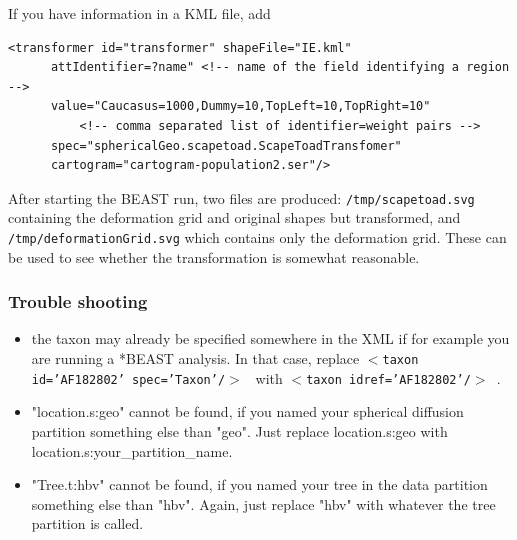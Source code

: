\documentclass{article}
\begin{document}
If you have information in a KML file, add

\begin{verbatim}
<transformer id="transformer" shapeFile="IE.kml"
      attIdentifier=?name" <!-- name of the field identifying a region -->
      value="Caucasus=1000,Dummy=10,TopLeft=10,TopRight=10"
          <!-- comma separated list of identifier=weight pairs -->
      spec="sphericalGeo.scapetoad.ScapeToadTransfomer"
      cartogram="cartogram-population2.ser"/>
\end{verbatim}

After starting the BEAST run, two files are produced:
{\tt /tmp/scapetoad.svg} containing the deformation grid and original shapes but transformed, and 
{\tt /tmp/deformationGrid.svg} which contains only the deformation grid. These can be used to see whether the transformation is somewhat reasonable.

\subsubsection*{Trouble shooting}
\begin{itemize}
\item the taxon may already be specified somewhere in the XML if for example you are running a *BEAST analysis. In that case, replace {\tt $<$taxon id='AF182802' spec='Taxon'/$>$ } with {\tt$<$taxon idref='AF182802'/$>$ }.
\item "location.s:geo" cannot be found, if you named your spherical diffusion partition something else than "geo". Just replace location.s:geo with location.s:your\_partition\_name.
\item "Tree.t:hbv" cannot be found, if you named your tree in the data partition something else than "hbv". Again, just replace "hbv" with whatever the tree partition is called.
\end{itemize}




\end{document}
